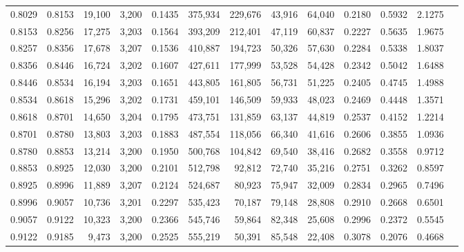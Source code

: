 \begin{tabular}{rrrrrrrrrrrrr}
0.8029 & 0.8153 & 19,100 & 3,200 &                                     0.1435 & 375,934 & 229,676 &  43,916 &  64,040 & 0.2180 & 0.5932 & 2.1275 \\
0.8153 & 0.8256 & 17,275 & 3,203 &                                     0.1564 & 393,209 & 212,401 &  47,119 &  60,837 & 0.2227 & 0.5635 & 1.9675 \\
0.8257 & 0.8356 & 17,678 & 3,207 &                                     0.1536 & 410,887 & 194,723 &  50,326 &  57,630 & 0.2284 & 0.5338 & 1.8037 \\
0.8356 & 0.8446 & 16,724 & 3,202 &                                     0.1607 & 427,611 & 177,999 &  53,528 &  54,428 & 0.2342 & 0.5042 & 1.6488 \\
0.8446 & 0.8534 & 16,194 & 3,203 &                                     0.1651 & 443,805 & 161,805 &  56,731 &  51,225 & 0.2405 & 0.4745 & 1.4988 \\
0.8534 & 0.8618 & 15,296 & 3,202 &                                     0.1731 & 459,101 & 146,509 &  59,933 &  48,023 & 0.2469 & 0.4448 & 1.3571 \\
0.8618 & 0.8701 & 14,650 & 3,204 &                                     0.1795 & 473,751 & 131,859 &  63,137 &  44,819 & 0.2537 & 0.4152 & 1.2214 \\
0.8701 & 0.8780 & 13,803 & 3,203 &                                     0.1883 & 487,554 & 118,056 &  66,340 &  41,616 & 0.2606 & 0.3855 & 1.0936 \\
0.8780 & 0.8853 & 13,214 & 3,200 &                                     0.1950 & 500,768 & 104,842 &  69,540 &  38,416 & 0.2682 & 0.3558 & 0.9712 \\
0.8853 & 0.8925 & 12,030 & 3,200 &                                     0.2101 & 512,798 &  92,812 &  72,740 &  35,216 & 0.2751 & 0.3262 & 0.8597 \\
0.8925 & 0.8996 & 11,889 & 3,207 &                                     0.2124 & 524,687 &  80,923 &  75,947 &  32,009 & 0.2834 & 0.2965 & 0.7496 \\
0.8996 & 0.9057 & 10,736 & 3,201 &                                     0.2297 & 535,423 &  70,187 &  79,148 &  28,808 & 0.2910 & 0.2668 & 0.6501 \\
0.9057 & 0.9122 & 10,323 & 3,200 &                                     0.2366 & 545,746 &  59,864 &  82,348 &  25,608 & 0.2996 & 0.2372 & 0.5545 \\
0.9122 & 0.9185 &  9,473 & 3,200 &                                     0.2525 & 555,219 &  50,391 &  85,548 &  22,408 & 0.3078 & 0.2076 & 0.4668 \\

\end{tabular}
